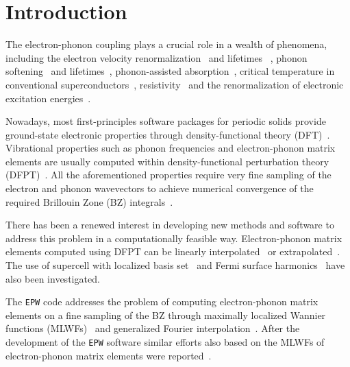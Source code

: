 \documentclass[final,3p,times,twocolumn]{elsarticle}
\begin{document}
\section{Introduction}
\label{Introduction}

The electron-phonon coupling plays a crucial role in a wealth of phenomena, including the electron velocity renormalization~\cite{Park2007} and lifetimes ~\cite{Park2009,Eiguren2003}, phonon softening~\cite{Pisana2007} and lifetimes~\cite{Liao2015,Lazzeri2006}, phonon-assisted absorption~\cite{Kioupakis2010,Noffsinger2012,Zacharias2015}, critical temperature in conventional superconductors~\cite{Choi2002,Luders2005,Marques2005,Margine2014,Margine2016},  resistivity~\cite{Restrepo2009,Park2014} and the renormalization of electronic excitation energies~\cite{Franceschetti2007,Kamisaka2008,Ibrahim2008,Ramirez2006,Ramirez2008,Capaz2005,Patrick2013,Han2013,
Monserrat2013,Monserrat2014a,Antonius2014,Monserrat2016,Marini2008,Giustino2010,Gonze2011,Cannuccia2011,Cannuccia2012,Kawai2014,Ponce2014,Ponce2014a,Marini2015,Ponce2015,Antonius2015}. 

Nowadays, most first-principles software packages for periodic solids provide ground-state electronic properties through density-functional theory (DFT)~\cite{Hohenberg1964,Kohn1965}. Vibrational properties such as phonon frequencies and electron-phonon matrix elements are usually computed within density-functional perturbation theory (DFPT)~\cite{Baroni1987,Savrasov1992,Gonze1997,Baroni2001}.
All the aforementioned properties require very fine sampling of the electron and phonon wavevectors to achieve numerical convergence of the required Brillouin Zone (BZ) integrals~\cite{Giustino2007,Ponce2014,Ponce2015}. 

There has been a renewed interest in developing new methods and software to address this problem in a computationally feasible way. 
Electron-phonon matrix elements computed using DFPT can be linearly interpolated~\cite{Li2015} or extrapolated~\cite{Ponce2015}. The use of supercell with localized basis set~\cite{Gunst2016} and Fermi surface harmonics~\cite{Allen1976a,Eiguren2014} have also been investigated.   

The \texttt{EPW} code addresses the problem of computing electron-phonon matrix elements on a fine sampling of the BZ through maximally localized Wannier functions (MLWFs)~\cite{Marzari1997, Souza2001, Mostofi2008} and generalized Fourier interpolation~\cite{Giustino2007}. 
After the development of the \texttt{EPW} software similar efforts also based on the MLWFs of electron-phonon matrix elements were reported~\cite{Calandra2010,Sjakste2015,Calandra2015}.
\end{document}
